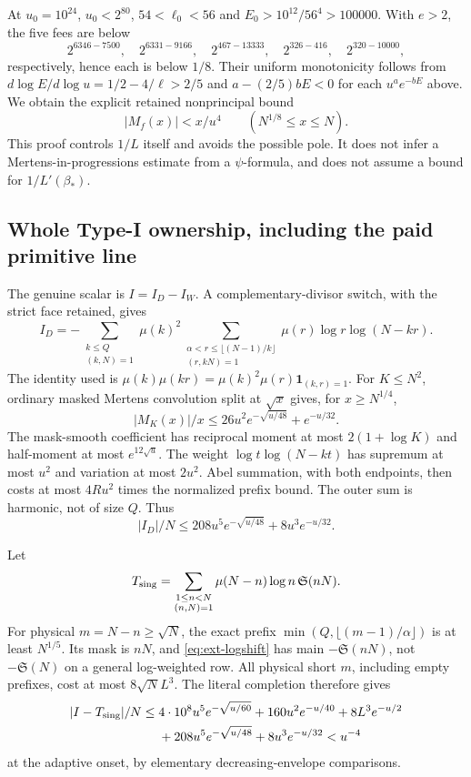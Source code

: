 \documentclass[11pt,a4paper]{article}
\theoremstyle{definition}
\theoremstyle{remark}
\begin{document}
At $u_0=10^{24}$, $u_0<2^{80}$, $54<\ell_0<56$ and
$E_0>10^{12}/56^4>100000$. With $e>2$, the five fees are below
\[
 2^{6346-7500},\quad2^{6331-9166},\quad
 2^{467-13333},\quad2^{326-416},\quad2^{320-10000},
\]
respectively, hence each is below $1/8$.
Their uniform monotonicity follows from
$d\log E/d\log u=1/2-4/\ell>2/5$ and
$a-(2/5)bE<0$ for each $u^ae^{-bE}$ above.
We obtain the explicit retained nonprincipal bound
\begin{equation}\label{eq:ext-mobiusprefix}
 |M_f(x)|<x/u^4\qquad(N^{1/8}\leq x\leq N).
\end{equation}
This proof controls $1/L$ itself and avoids the possible pole.
It does not infer a Mertens-in-progressions estimate from a
$\psi$-formula, and does not assume a bound for $1/L'(\beta_*)$.

\subsection{Whole Type-I ownership, including the paid primitive line}

The genuine scalar is $I=I_D-I_W$. A complementary-divisor switch,
with the strict face retained, gives
\[
 I_D=-\sum_{\substack{k\leq Q\\(k,N)=1}}\mu(k)^2
 \sum_{\substack{\alpha<r\leq\lfloor(N-1)/k\rfloor\\(r,kN)=1}}
                  \mu(r)\log r\log(N-kr).
\]
The identity used is
$\mu(k)\mu(kr)=\mu(k)^2\mu(r)\mathbf1_{(k,r)=1}$.
For $K\leq N^2$, ordinary masked Mertens convolution split at
$\sqrt x$ gives, for $x\geq N^{1/4}$,
\[
 |M_K(x)|/x\leq26u^2e^{-\sqrt{u/48}}+e^{-u/32}.
\]
The mask-smooth coefficient has reciprocal moment at most
$2(1+\log K)$ and half-moment at most $e^{12\sqrt u}$.
The weight $\log t\log(N-kt)$ has supremum at most $u^2$ and
variation at most $2u^2$. Abel summation, with both endpoints,
then costs at most $4Ru^2$ times the normalized prefix bound.
The outer sum is harmonic, not of size $Q$. Thus
\[
 |I_D|/N\leq208u^5e^{-\sqrt{u/48}}+8u^3e^{-u/32}.
\]

Let
\[
 T_{\rm sing}=\sum_{\substack{1\leq n<N\\(n,N)=1}}
                   \mu(N-n)\log n\,\mathfrak S(nN).
\]
For physical $m=N-n\geq\sqrt N$, the exact prefix
$\min(Q,\lfloor(m-1)/\alpha\rfloor)$ is at least $N^{1/5}$.
Its mask is $nN$, and \eqref{eq:ext-logshift} has main
$-\mathfrak S(nN)$, not $-\mathfrak S(N)$ on a general log-weighted
row. All physical short $m$, including empty prefixes, cost at most
$8\sqrt N L^3$. The literal completion therefore gives
\begin{align*}
 |I-T_{\rm sing}|/N\leq{}&4\cdot10^8u^5e^{-\sqrt{u/60}}
        +160u^2e^{-u/40}+8L^3e^{-u/2}\\
        &+208u^5e^{-\sqrt{u/48}}+8u^3e^{-u/32}<u^{-4}
\end{align*}
at the adaptive onset, by elementary decreasing-envelope comparisons.
\end{document}
